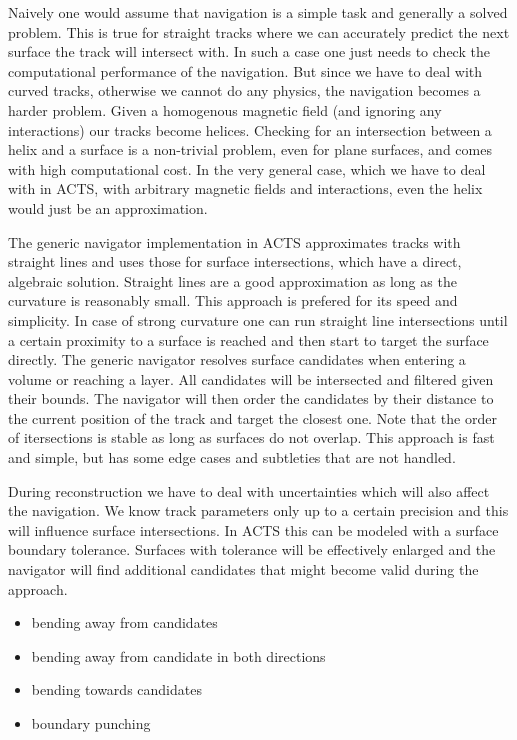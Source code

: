 Naively one would assume that navigation is a simple task and generally a solved problem. This is true for straight tracks where we can accurately predict the next surface the track will intersect with. In such a case one just needs to check the computational performance of the navigation. But since we have to deal with curved tracks, otherwise we cannot do any physics, the navigation becomes a harder problem. Given a homogenous magnetic field (and ignoring any interactions) our tracks become helices. Checking for an intersection between a helix and a surface is a non-trivial problem, even for plane surfaces, and comes with high computational cost. In the very general case, which we have to deal with in ACTS, with arbitrary magnetic fields and interactions, even the helix would just be an approximation.

The generic navigator implementation in ACTS approximates tracks with straight lines and uses those for surface intersections, which have a direct, algebraic solution. Straight lines are a good approximation as long as the curvature is reasonably small. This approach is prefered for its speed and simplicity. In case of strong curvature one can run straight line intersections until a certain proximity to a surface is reached and then start to target the surface directly. The generic navigator resolves surface candidates when entering a volume or reaching a layer. All candidates will be intersected and filtered given their bounds. The navigator will then order the candidates by their distance to the current position of the track and target the closest one. Note that the order of itersections is stable as long as surfaces do not overlap. This approach is fast and simple, but has some edge cases and subtleties that are not handled.

During reconstruction we have to deal with uncertainties which will also affect the navigation. We know track parameters only up to a certain precision and this will influence surface intersections. In ACTS this can be modeled with a surface boundary tolerance. Surfaces with tolerance will be effectively enlarged and the navigator will find additional candidates that might become valid during the approach.

\begin{itemize}
    \color{red}
    \item bending away from candidates
    \item bending away from candidate in both directions
    \item bending towards candidates
    \item boundary punching
\end{itemize}

